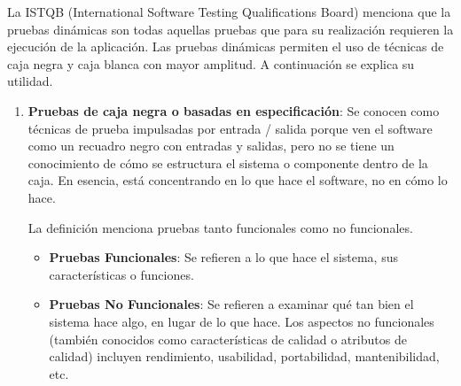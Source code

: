 La ISTQB (International Software Testing Qualifications Board) menciona que la pruebas dinámicas son todas aquellas pruebas que para su realización requieren la ejecución de la aplicación. Las pruebas dinámicas permiten el uso de técnicas de caja negra y caja blanca con mayor amplitud. A continuación se explica su utilidad.
\begin{enumerate}
	\item \textbf {Pruebas de caja negra o basadas en especificación}: Se conocen como técnicas de prueba impulsadas por entrada / salida porque ven el software como un recuadro negro con entradas y salidas, pero no se tiene un conocimiento de cómo se estructura el sistema o componente dentro de la caja. En esencia, está concentrando en lo que hace el software, no en cómo lo hace.
	
		La definición menciona pruebas tanto funcionales como no funcionales.
		\begin{itemize}
			\item \textbf {Pruebas Funcionales}: Se refieren a lo que hace el sistema, sus características o funciones.
			\item \textbf {Pruebas No Funcionales}: Se refieren a examinar qué tan bien el sistema hace algo, en lugar de lo que hace. Los aspectos no funcionales (también conocidos como características de calidad o atributos de calidad) incluyen rendimiento, usabilidad, portabilidad, mantenibilidad, etc. 
		\end{itemize}
	

\end{enumerate}

